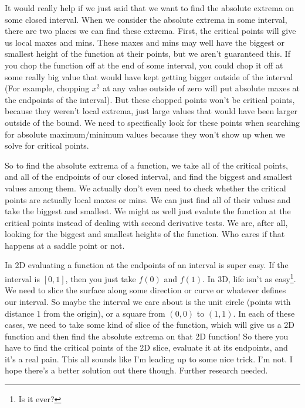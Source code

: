 \documentclass[12pt, letterpaper]{article}
\begin{document}
It would really help if we just said that we want to find the absolute extrema on some closed interval.
When we consider the absolute extrema in some interval, there are two places we can find these extrema.
First, the critical points will give us local maxes and mins. 
These maxes and mins may well have the biggest or smallest height of the function at their points, but we aren't guaranteed this.
If you chop the function off at the end of some interval, you could chop it off at some really big value that would have kept getting bigger outside of the interval
(For example, chopping $x^2$ at any value outside of zero will put absolute maxes at the endpoints of the interval). 
But these chopped points won't be critical points, because they weren't local extrema, just large values that would have been larger outside of the bound.
We need to specifically look for these points when searching for absolute maximum/minimum values because they won't show up when we solve for critical points.

So to find the absolute extrema of a function, we take all of the critical points, and all of the endpoints of our closed interval, and find the biggest and smallest values among them.
We actually don't even need to check whether the critical points are actually local maxes or mins. We can just find all of their values and take the biggest and smallest.
We might as well just evalute the function at the critical points instead of dealing with second derivative tests.
We are, after all, looking for the biggest and smallest heights of the function.
Who cares if that happens at a saddle point or not.

In 2D evaluating a function at the endpoints of an interval is super easy. If the interval is $[0, 1]$, then you just take $f(0)$ and $f(1)$.
In 3D, life isn't as easy\footnote{Is it ever?}.
We need to slice the surface along some direction or curve or whatever defines our interval.
So maybe the interval we care about is the unit circle (points with distance 1 from the origin), or a square from $(0, 0)$ to $(1, 1)$.
In each of these cases, we need to take some kind of slice of the function, which will give us a 2D function and then find the absolute extrema on that 2D function!
So there you have to find the critical points of the 2D slice, evaluate it at its endpoints, and it's a real pain.
This all sounds like I'm leading up to some nice trick. I'm not. I hope there's a better solution out there though.
Further research needed.
\end{document}
